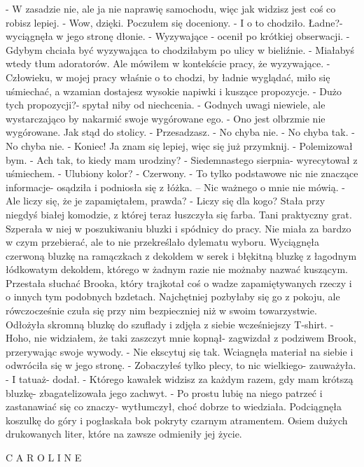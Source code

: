 \documentclass[12pt,a4paper]{book}
\begin{document}
- W zasadzie nie, ale ja nie naprawię samochodu, więc jak widzisz jest coś co robisz lepiej. 
- Wow, dzięki. Poczułem się doceniony. 
- I o to chodziło. Ładne?- wyciągnęła w jego stronę dłonie. 
- Wyzywające - ocenił po krótkiej obserwacji. 
- Gdybym chciała być wyzywająca to chodziłabym po ulicy w bieliźnie. 
- Miałabyś wtedy tłum adoratorów. Ale mówiłem w kontekście pracy, że wyzywające. 
- Człowieku, w mojej pracy właśnie o to chodzi, by ładnie wyglądać, miło się uśmiechać, a wzamian dostajesz wysokie napiwki i kuszące propozycje. 
- Dużo tych propozycji?- spytał niby od niechcenia.
- Godnych uwagi niewiele, ale wystarczająco by nakarmić swoje wygórowane ego. 
- Ono jest olbrzmie nie wygórowane. Jak stąd do stolicy.
- Przesadzasz.
- No chyba nie. 
- No chyba tak. 
- No chyba nie.
- Koniec! Ja znam się lepiej, więc się już przymknij. 
- Polemizował bym.
- Ach tak, to kiedy mam urodziny?
- Siedemnastego sierpnia- wyrecytował z uśmiechem.
- Ulubiony kolor?
- Czerwony.
- To tylko podstawowe nic nie znaczące informacje- osądziła i podniosła się z łóżka. – Nic ważnego o mnie nie mówią. 
- Ale liczy się, że je zapamiętałem, prawda? 
- Liczy się dla kogo?
Stała przy niegdyś białej komodzie, z której teraz łuszczyła się farba. Tani praktyczny grat. Szperała w niej w poszukiwaniu bluzki i spódnicy do pracy. Nie miała za bardzo w czym przebierać, ale to nie przekreślało dylematu wyboru. Wyciągnęła czerwoną bluzkę na ramączkach z dekoldem w serek i błękitną bluzkę z łagodnym łódkowatym dekoldem, którego w żadnym razie nie możnaby nazwać kuszącym. Przestała słuchać Brooka, który trajkotał coś o wadze zapamiętywanych rzeczy i o innych tym podobnych bzdetach.
Najchętniej pozbyłaby się go z pokoju, ale rówczocześnie czuła się przy nim bezpieczniej niż w swoim towarzystwie. Odłożyła skromną bluzkę do szuflady i zdjęła z siebie wcześniejszy T-shirt. 
- Hoho, nie widziałem, że taki zaszczyt mnie kopnął- zagwizdał z podziwem Brook, przerywając swoje wywody. 
- Nie ekscytuj się tak. 
Wciagnęła materiał na siebie i odwróciła się w jego stronę. 
- Zobaczyłeś tylko plecy, to nic wielkiego- zauważyła. 
- I tatuaż- dodał. 
- Którego kawałek widzisz za każdym razem, gdy mam krótszą bluzkę- zbagatelizowała jego zachwyt. 
- Po prostu lubię na niego patrzeć i zastanawiać się co znaczy- wytłumczył, choć dobrze to wiedziała. 
Podciągnęła koszulkę do góry i pogłaskała bok pokryty czarnym atramentem. Osiem dużych drukowanych liter, które na zawsze odmieniły jej życie. 

C A R O L I N E
\end{document}
